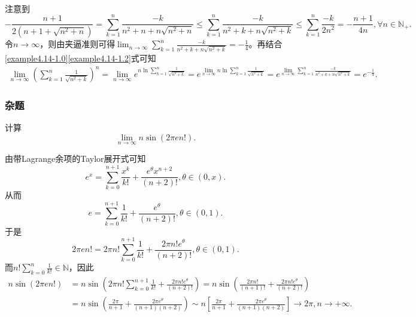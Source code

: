 \documentclass[lang=cn,newtx,10pt,scheme=chinese]{elegantbook}
\begin{document}
\begin{solution}
\begin{align}
\end{align}
注意到
\[
-\frac{n+1}{2\left( n+1+\sqrt{n^2+n} \right)}=\sum_{k=1}^n{\frac{-k}{n^2+n+n\sqrt{n^2+n}}}\leqslant \sum_{k=1}^n{\frac{-k}{n^2+k+n\sqrt{n^2+k}}}\leqslant \sum_{k=1}^n{\frac{-k}{2n^2}}=-\frac{n+1}{4n},\forall n\in \mathbb{N}_+.
\]
令\(n\rightarrow \infty\)，则由夹逼准则可得\(\lim_{n\rightarrow \infty} \sum_{k=1}^n{\frac{-k}{n^2+k+n\sqrt{n^2+k}}}=-\frac{1}{4}\)。再结合\eqref{example4.14-1.0}\eqref{example4.14-1.2}式可知
\begin{align*}
\lim_{n\rightarrow \infty} \left( \sum_{k=1}^n{\frac{1}{\sqrt{n^2+k}}} \right) ^n=\lim_{n\rightarrow \infty} e^{n\ln \sum\limits_{k=1}^n{\frac{1}{\sqrt{n^2+k}}}}
=e^{\lim\limits_{n\rightarrow \infty} n\ln \sum\limits_{k=1}^n{\frac{1}{\sqrt{n^2+k}}}}
=e^{\lim\limits_{n\rightarrow \infty} \sum\limits_{k=1}^n{\frac{-k}{n^2+k+n\sqrt{n^2+k}}}}
=e^{-\frac{1}{4}}.
\end{align*}
\end{solution}





\subsubsection{杂题}

\begin{example}
   计算
\[
\lim_{n\rightarrow \infty}n\sin(2\pi en!).
\]
\end{example}
\begin{solution}
   由带Lagrange余项的Taylor展开式可知
   \[
   e^x = \sum_{k = 0}^{n + 1}\frac{x^k}{k!} + \frac{e^{\theta}x^{n + 2}}{(n + 2)!}, \theta \in (0, x).
   \]
   从而
   \[
   e = \sum_{k = 0}^{n + 1}\frac{1}{k!} + \frac{e^{\theta}}{(n + 2)!}, \theta \in (0, 1).
   \]
   于是
   \[
   2\pi en! = 2\pi n!\sum_{k = 0}^{n + 1}\frac{1}{k!} + \frac{2\pi n!e^{\theta}}{(n + 2)!}, \theta \in (0, 1).
   \]
   而\(n!\sum_{k = 0}^n\frac{1}{k!} \in \mathbb{N}\)，因此
   \begin{align*}
   n\sin(2\pi en!)&=n\sin\left(2\pi n!\sum_{k = 0}^{n + 1}\frac{1}{k!} + \frac{2\pi n!e^{\theta}}{(n + 2)!}\right)
   =n\sin\left(\frac{2\pi n!}{(n + 1)!} + \frac{2\pi n!e^{\theta}}{(n + 2)!}\right)\\
   &=n\sin\left(\frac{2\pi}{n + 1} + \frac{2\pi e^{\theta}}{(n + 1)(n + 2)}\right)
   \sim n\left[\frac{2\pi}{n + 1} + \frac{2\pi e^{\theta}}{(n + 1)(n + 2)}\right] \to 2\pi, n \to +\infty.
   \end{align*} 
\end{solution}
\end{document}
